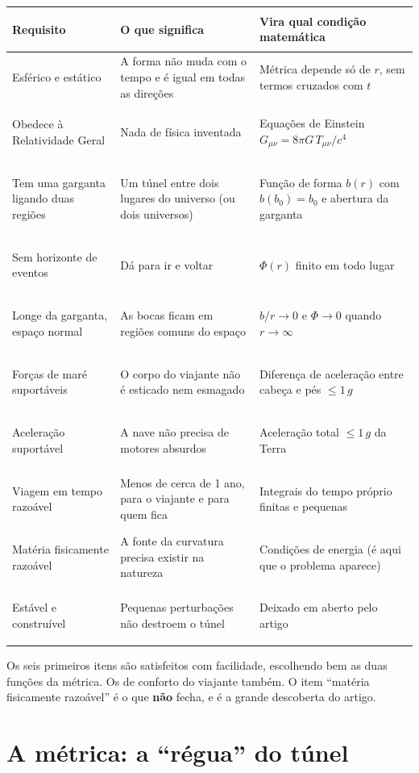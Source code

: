 \documentclass[11pt,a4paper]{article}
\begin{document}
\begin{center}
\small
\begin{tabularx}{\linewidth}{>{\bfseries\raggedright\arraybackslash}p{3.4cm} Y Y}
\toprule
Requisito & O que significa & Vira qual condição matemática \\
\midrule
Esférico e estático & A forma não muda com o tempo e é igual em todas as direções & Métrica depende só de $r$, sem termos cruzados com $t$ \\
Obedece à Relatividade Geral & Nada de física inventada & Equações de Einstein $G_{\mu\nu} = 8\pi G\,T_{\mu\nu}/c^4$ \\
Tem uma garganta ligando duas regiões & Um túnel entre dois lugares do universo (ou dois universos) & Função de forma $b(r)$ com $b(b_0)=b_0$ e abertura da garganta \\
Sem horizonte de eventos & Dá para ir e voltar & $\Phi(r)$ finito em todo lugar \\
Longe da garganta, espaço normal & As bocas ficam em regiões comuns do espaço & $b/r \to 0$ e $\Phi \to 0$ quando $r\to\infty$ \\
Forças de maré suportáveis & O corpo do viajante não é esticado nem esmagado & Diferença de aceleração entre cabeça e pés $\le 1\,g$ \\
Aceleração suportável & A nave não precisa de motores absurdos & Aceleração total $\le 1\,g$ da Terra \\
Viagem em tempo razoável & Menos de cerca de 1 ano, para o viajante e para quem fica & Integrais do tempo próprio finitas e pequenas \\
Matéria fisicamente razoável & A fonte da curvatura precisa existir na natureza & Condições de energia (é aqui que o problema aparece) \\
Estável e construível & Pequenas perturbações não destroem o túnel & Deixado em aberto pelo artigo \\
\bottomrule
\end{tabularx}
\end{center}

Os seis primeiros itens são satisfeitos com facilidade, escolhendo bem as duas funções da métrica. Os de conforto do
viajante também. O item ``matéria fisicamente razoável'' é o que \textbf{não} fecha, e é a grande descoberta do artigo.

\section{A métrica: a ``régua'' do túnel}
\end{document}
